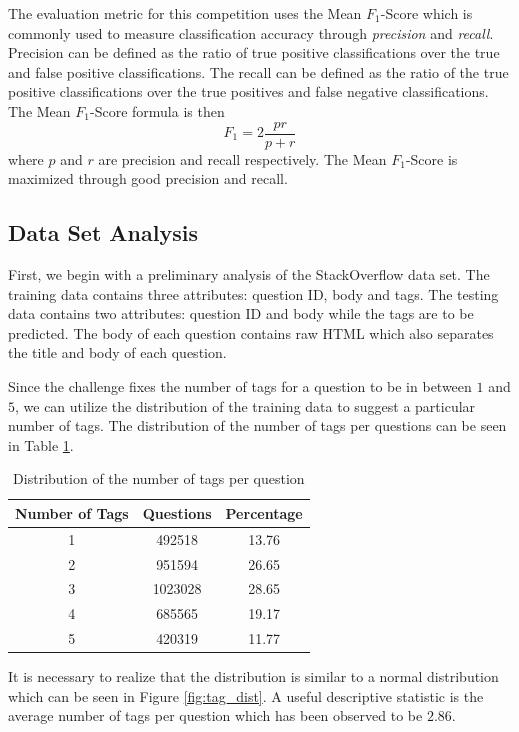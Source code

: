 \documentclass{sig-alternate}
\newcommand{\Fone}{$F_1$}
\begin{document}
	The evaluation metric for this competition uses the Mean \Fone-Score
	which is commonly used to measure classification accuracy through
	\emph{precision} and \emph{recall}. Precision can be defined as the
	ratio of true positive classifications over the true and false
	positive classifications. The recall can be defined as the ratio of
	the true positive classifications over the true positives and false
	negative classifications. The Mean \Fone-Score formula is then
	\[
		F_1 = 2\frac{pr}{p + r}
	\]
	where $p$ and $r$ are precision and recall respectively. The Mean
	\Fone-Score is maximized through good precision and recall.

	\subsection{Data Set Analysis} %
	\label{sub:Data Set Analysis}
		First, we begin with a preliminary analysis of the StackOverflow data
		set. The training data contains three attributes: question ID, body and
		tags. The testing data contains two attributes: question ID and body
		while the tags are to be predicted. The body of each question contains
		raw HTML which also separates the title and body of each question.
		
		Since the challenge fixes the number of tags for a question to be
		in between $1$ and $5$, we can utilize the distribution of the training
		data to suggest a particular number of tags. The distribution of the
		number of tags per questions can be seen in Table \ref{tab:tag_dist}.
		\begin{table}[htp]
			\centering
			\begin{tabular}{|c|c|c|}
				\hline
				\textbf{Number of Tags} & \textbf{Questions} & \textbf{Percentage} \\\hline
				1	& 492518	& 13.76	\\\hline
				2	& 951594	& 26.65	\\\hline
				3	& 1023028	& 28.65	\\\hline
				4	& 685565	& 19.17	\\\hline
				5	& 420319	& 11.77	\\\hline
			\end{tabular}
			\label{tab:tag_dist}
			\caption{Distribution of the number of tags per question}
		\end{table}
		It is necessary to realize that the distribution is similar to a normal
		distribution which can be seen in Figure \ref{fig:tag_dist}. A useful
		descriptive statistic is the average number of tags per question which
		has been observed to be $2.86$.
\end{document}
